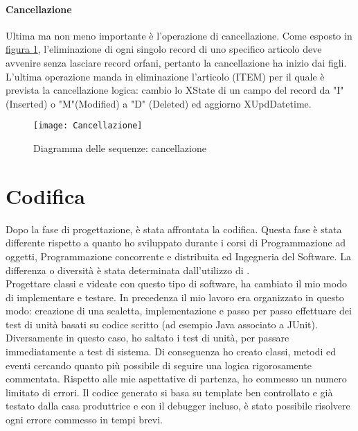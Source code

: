 \paragraph{Cancellazione}
Ultima ma non meno importante è l'operazione di cancellazione. Come esposto in \hyperref[DS:cancellazione]{figura \ref{DS:cancellazione}}, l'eliminazione di ogni singolo record di uno specifico articolo deve avvenire senza lasciare record orfani, pertanto la cancellazione ha inizio dai figli. L'ultima operazione manda in eliminazione l'articolo (ITEM) per il quale è prevista la cancellazione logica: cambio lo XState di un campo del record da "I" (Inserted) o "M"(Modified) a "D" (Deleted) ed aggiorno XUpdDatetime.

\begin{figure}[!h] 
	\centering 
	\texttt{[image: Cancellazione]} 
	\caption{Diagramma delle sequenze: cancellazione}
	\label{DS:cancellazione}
\end{figure}



\section{Codifica}
Dopo la fase di progettazione, è stata affrontata la codifica. Questa fase è stata differente rispetto a quanto ho sviluppato durante i corsi di Programmazione ad oggetti, Programmazione concorrente e distribuita ed Ingegneria del Software. La differenza o diversità è stata determinata dall'utilizzo di \inde.\\
Progettare classi e videate con questo tipo di software, ha cambiato il mio modo di implementare e testare. In precedenza il mio lavoro era organizzato in questo modo: creazione di una scaletta, implementazione e passo per passo effettuare dei test di unità basati su codice scritto (ad esempio Java associato a JUnit).\\
Diversamente in questo caso, ho saltato i test di unità, per passare immediatamente a test di sistema. Di conseguenza ho creato classi, metodi ed eventi cercando quanto più possibile di seguire una logica rigorosamente commentata. 
Rispetto alle mie aspettative di partenza, ho commesso un numero limitato di errori. Il codice generato si basa su template ben controllato e già testato dalla casa produttrice e con il debugger incluso, è stato possibile risolvere ogni errore commesso in tempi brevi.


